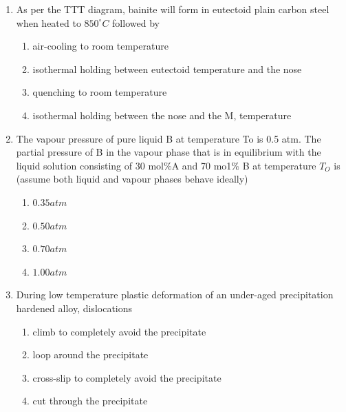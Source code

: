 \documentclass[journal]{IEEEtran}
\theoremstyle{remark}
\begin{document}
\begin{enumerate}
\item As per the TTT diagram, bainite will form in eutectoid plain carbon steel when heated to $850^\circ C$ followed by\hfill{}


\begin{enumerate}
\item  air-cooling to room temperature
\item  isothermal holding between eutectoid temperature and the nose
\item  quenching to room temperature
\item  isothermal holding between the nose and the M, temperature
\end{enumerate}

\item   The vapour pressure of pure liquid B at temperature To is 0.5 atm. The partial pressure of B in the
vapour phase that is in equilibrium with the liquid solution consisting of 30 mol$\%$A and 70 mo1$\%$ B at
temperature $T_O$ is (assume both liquid and vapour phases behave ideally)

\hfill{}
\begin{multicols}{4}
\begin{enumerate}
\item  $0.35 atm$
\item $0.50 atm$
\item  $0.70 atm$
\item  $1.00 atm$
\end{enumerate}
\end{multicols}

\item  During low temperature plastic deformation of an under-aged precipitation hardened alloy, dislocations \hfill{}
\begin{enumerate}
\item  climb to completely avoid the precipitate
\item loop around the precipitate
\item  cross-slip to completely avoid the precipitate
\item  cut through the precipitate
\end{enumerate}


\end{enumerate}
\end{document}
